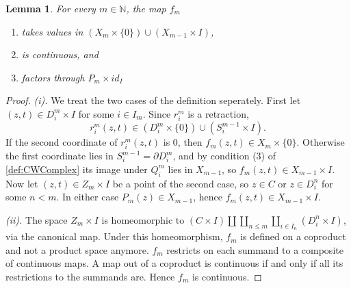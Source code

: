 \documentclass[11pt, a4paper, english]{article}
\renewcommand{\boundary}{\partial}
\theoremstyle{plain}
\newtheorem{lemma}[theorem]{Lemma}
\theoremstyle{definition}
\theoremstyle{remark}
\numberwithin{equation}{section}
\numberwithin{theorem}{section}
\begin{document}
\begin{lemma} \label{lem:fm}
    For every $m \in \mathbb{N}$, the map $f_m$  
    \begin{enumerate}
    \renewcommand{\labelenumi}{(\roman{enumi})}
    \item takes values in $(X_m \times \{0\}) \cup (X_{m-1} \times I)$,
    \item is continuous, and
    \item factors through $P_m \times id_I$
    \end{enumerate}
\end{lemma}

\begin{proof}
    \emph{(i).}
We treat the two cases of the definition seperately. First let $(z,t) \in D_i^m \times I$ for some $i \in I_m$. Since $r_i^m$ is a retraction,
\[
    r_i^m(z,t) \in (D_i^m \times \{0\}) \cup (S_i^{m-1} \times I).
\]
If the second coordinate of $r_i^m(z,t)$ is $0$, then $f_m(z,t) \in X_m \times \{0\}$. Otherwise the first coordinate lies in $S_i^{m-1} = \boundary D_i^m$, and by condition (3) of \cref{def:CWComplex} its image under $Q_i^m$ lies in $X_{m-1}$, so $f_m(z,t) \in X_{m-1} \times I$. \\
Now let $(z,t) \in Z_m \times I$ be a point of the second case, so $z \in C$ or $z \in D_i^n$ for some $n < m$. In either case $P_m(z) \in X_{m-1}$, hence $f_m(z,t) \in X_{m-1} \times I$.

    \emph{(ii).} 
The space $Z_{m} \times I$ is homeomorphic to $(C \times I) \amalg \coprod_{n \le m} \coprod_{i\in I_n}  (D_i^n \times I)$, via the canonical map. Under this homeomorphism, $f_m$ is defined on a coproduct and not a product space anymore. $f_m$ restricts on each summand to a composite of continuous maps. A map out of a coproduct is continuous if and only if all its restrictions to the summands are. Hence $f_m$ is continuous.


\end{proof}
\end{document}
